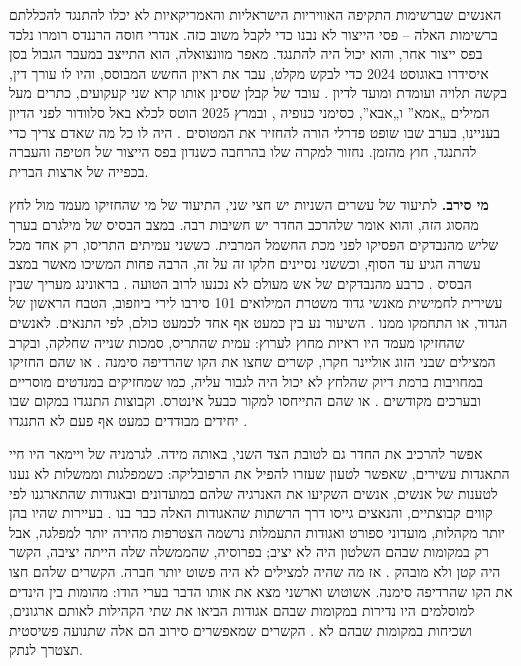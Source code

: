 האנשים שברשימות התקיפה האוויריות הישראליות והאמריקאיות לא יכלו להתנגד להכללתם ברשימות האלה – פסי הייצור לא נבנו כדי לקבל משוב כזה. אנדרי חוסה הרננדס רומרו נלכד בפס ייצור אחר, והוא יכול היה להתנגד. מאפר מוונצואלה, הוא התייצב במעבר הגבול בסן איסידרו באוגוסט 2024 כדי לבקש מקלט, עבר את ראיון החשש המבוסס, והיו לו עורך דין, בקשה תלויה ועומדת ומועד לדיון \autocite{LULAC2025HernandezRomero,Vega2025HernandezRomero}. עובד של קבלן שסינן אותו קרא שני קעקועים, כתרים מעל המילים „אמא” ו„אבא”, כסימני כנופיה \autocite{Palomera2025Blade}, ובמרץ 2025 הוטס לכלא באל סלוודור לפני הדיון בעניינו, בערב שבו שופט פדרלי הורה להחזיר את המטוסים \autocite{jgg2025contempt}. היה לו כל מה שאדם צריך כדי להתנגד, חוץ מהזמן. נחזור למקרה שלו בהרחבה כשנדון בפס הייצור של חטיפה והעברה בכפייה של ארצות הברית.

\textbf{מי סירב.} לתיעוד של עשרים השניות יש חצי שני, התיעוד של מי שהחזיקו מעמד מול לחץ מהסוג הזה, והוא אומר שלהרכב החדר יש חשיבות רבה. במצב הבסיס של מילגרם בערך שליש מהנבדקים הפסיקו לפני מכת החשמל המרבית. כששני עמיתים התריסו, רק אחד מכל עשרה הגיע עד הסוף, וכששני נסיינים חלקו זה על זה, הרבה פחות המשיכו מאשר במצב הבסיס \autocite{milgram1974obedience}. כרבע מהנבדקים של אש מעולם לא נכנעו לרוב הטועה \autocite{asch1956studies}. בראונינג מעריך שבין עשירית לחמישית מאנשי גדוד משטרת המילואים 101 סירבו לירי ביוזפוב, הטבח הראשון של הגדוד, או התחמקו ממנו \autocite{browning1992ordinary}. השיעור נע בין כמעט אף אחד לכמעט כולם, לפי התנאים. לאנשים שהחזיקו מעמד היו ראיות מחוץ לערוץ: עמית שהתריס, סמכות שנייה שחלקה, ובקרב המצילים שבני הזוג אוליינר חקרו, קשרים שחצו את הקו שהרדיפה סימנה \autocite{oliner1988altruistic}. או שהם החזיקו במחויבות ברמת דיוק שהלחץ לא יכול היה לגבור עליה, כמו שמחזיקים במנדטים מוסריים ובערכים מקודשים \autocite{skitka2009limits,ginges2007sacred}. או שהם התייחסו למקור כבעל אינטרס. וקבוצות התנגדו במקום שבו יחידים מבודדים כמעט אף פעם לא התנגדו \autocite{gamson1982encounters}.

אפשר להרכיב את החדר גם לטובת הצד השני, באותה מידה. לגרמניה של ויימאר היו חיי התאגדות עשירים, שאפשר לטעון שעזרו להפיל את הרפובליקה: כשמפלגות וממשלות לא נענו לטענות של אנשים, אנשים השקיעו את האנרגיה שלהם במועדונים ובאגודות שהתארגנו לפי קווים קבוצתיים, והנאצים גייסו דרך הרשתות שהאגודות האלה כבר בנו \autocite{berman1997weimar}. בעיירות שהיו בהן יותר מקהלות, מועדוני ספורט ואגודות התעמלות נרשמה הצטרפות מהירה יותר למפלגה, אבל רק במקומות שבהם השלטון היה לא יציב; בפרוסיה, שהממשלה שלה הייתה יציבה, הקשר היה קטן ולא מובהק \autocite{satyanath2017bowling}. אז מה שהיה למצילים לא היה פשוט יותר חברה. הקשרים שלהם חצו את הקו שהרדיפה סימנה. אשוטוש וארשני מצא את אותו הדבר בערי הודו: מהומות בין הינדים למוסלמים היו נדירות במקומות שבהם אגודות הביאו את שתי הקהילות לאותם ארגונים, ושכיחות במקומות שבהם לא \autocite{varshney2002ethnic}. הקשרים שמאפשרים סירוב הם אלה שתנועה פשיסטית תצטרך לנתק.

